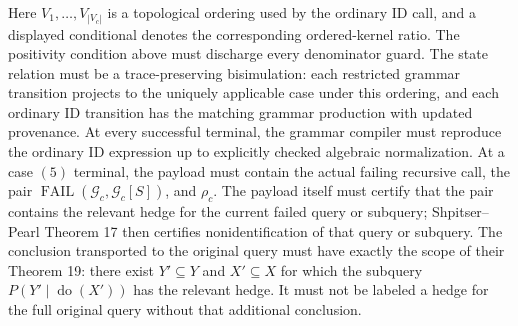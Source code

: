Here \(V_1,\ldots,V_{|V_c|}\) is a topological ordering used by the ordinary ID call, and a displayed conditional denotes the corresponding ordered-kernel ratio. The positivity condition above must discharge every denominator guard. The state relation must be a trace-preserving bisimulation: each restricted grammar transition projects to the uniquely applicable case under this ordering, and each ordinary ID transition has the matching grammar production with updated provenance. At every successful terminal, the grammar compiler must reproduce the ordinary ID expression up to explicitly checked algebraic normalization. At a case \((5)\) terminal, the payload must contain the actual failing recursive call, the pair \(\operatorname{FAIL}(\mathcal G_c,\mathcal G_c[S])\), and \(\rho_c\). The payload itself must certify that the pair contains the relevant hedge for the current failed query or subquery; Shpitser--Pearl Theorem 17 then certifies nonidentification of that query or subquery. The conclusion transported to the original query must have exactly the scope of their Theorem 19: there exist \(Y'\subseteq Y\) and \(X'\subseteq X\) for which the subquery \(P(Y'\mid\operatorname{do}(X'))\) has the relevant hedge. It must not be labeled a hedge for the full original query without that additional conclusion.

